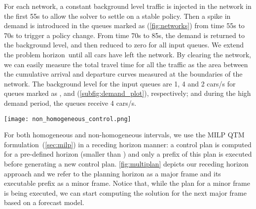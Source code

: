 For each network, a constant background level traffic is injected in the network
in the first 55s to allow the solver to settle on a stable policy.
%
Then a spike in demand is introduced in the queues marked as \qVarTraf
(\cref{fig:networks}) from time 55s to 70s to trigger a policy change.
%
%
From time 70s to 85s, the demand is returned to the background level, and then
reduced to zero for all input queues.
%
We extend the problem horizon~\TMAX until all cars have left the network.
%
By clearing the network, we can easily measure the total travel time for all the
traffic as the area between the cumulative arrival and departure curves measured
at the boundaries of the network.
%
%
%
The background level for the input queues are 1, 4 and 2 cars/s for queues
marked as \qLowTraf, \qHighTraf and \qVarTraf (\cref{subfig:demand_plot}),
respectively; and during the high demand period, the queues \qVarTraf receive 4
cars/s.




\begin{figure*}[t!]
\centering
\texttt{[image: non\_homogeneous\_control.png]}
\caption{Receding horizon control. In this example, the problem
  horizon \TMAX is 40s. The major frames for MILP optimization are
  discretized in 12 time intervals ($\Nn = 12$) and they span 15s and
  30s for homogeneous and non-homogeneous discretizations,
  respectively.  The minor frames represent the prefix of the 
  major frame MILP optimization that is executed.  The horizon
  recedes by the minor frame duration after each execution.}
\label{fig:multiplan}
\end{figure*}


For both homogeneous and non-homogeneous intervals, we use the MILP QTM
formulation~(\cref{sec:milp}) in a receding horizon manner: a control plan is
computed for a pre-defined horizon (smaller than \TMAX) and only a prefix of
this plan is executed before generating a new control plan. 
%
\cref{fig:multiplan} depicts our receding horizon approach and we refer to the
planning horizon as a major frame and its executable prefix as a minor frame.
%
Notice that, while the plan for a minor frame is being executed, we can start
computing the solution for the next major frame based on a forecast model.


